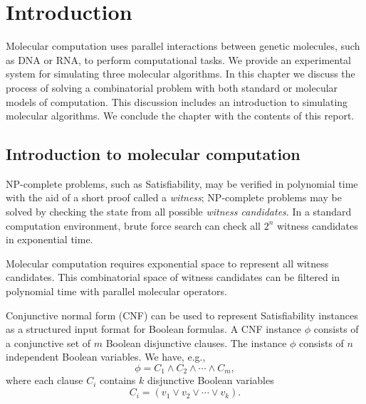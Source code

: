 \chapter{Introduction}


Molecular computation uses parallel interactions between genetic molecules, such as DNA or RNA, to perform computational tasks.  We provide an experimental system for simulating three molecular algorithms.  In this chapter we discuss the process of solving a combinatorial problem with both standard or molecular models of computation.  This discussion includes an introduction to simulating molecular algorithms.  We conclude the chapter with the contents of this report.

\section{Introduction to molecular computation}
	
				
\textsf{NP-complete} problems, such as {\sc Satisfiability}, may be verified in polynomial time with the aid of a short proof called a \textit{witness}; \textsf{NP-complete} problems may be solved by checking the state from all possible \textit{witness candidates}.  In a standard computation environment, brute force search can check all $2^n$ witness candidates in exponential time.

Molecular computation requires exponential space to represent all witness candidates.  This combinatorial space of witness candidates can be filtered in polynomial time with parallel molecular operators.

Conjunctive normal form (CNF) can be used to represent {\sc Satisfiability} instances as a structured input format for Boolean formulas.  A CNF instance $\phi$ consists of a conjunctive set of $m$ Boolean disjunctive clauses.  The instance $\phi$ consists of $n$ independent Boolean variables.  We have, e.g.,
\[
\phi = C_1 \wedge C_2 \wedge \cdots \wedge C_m, 
\]
where each clause $C_i$ contains $k$ disjunctive Boolean variables
\[
C_i = (v_1 \vee v_2 \vee \cdots \vee v_k).
\]

